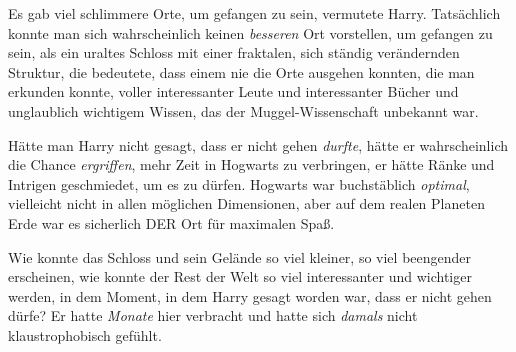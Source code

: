 Es gab viel schlimmere Orte, um gefangen zu sein, vermutete Harry. Tatsächlich konnte man sich wahrscheinlich keinen \emph{besseren} Ort vorstellen, um gefangen zu sein, als ein uraltes Schloss mit einer fraktalen, sich ständig verändernden Struktur, die bedeutete, dass einem nie die Orte ausgehen konnten, die man erkunden konnte, voller interessanter Leute und interessanter Bücher und unglaublich wichtigem Wissen, das der Muggel-Wissenschaft unbekannt war.

Hätte man Harry nicht gesagt, dass er nicht gehen \emph{durfte}, hätte er wahrscheinlich die Chance \emph{ergriffen}, mehr Zeit in Hogwarts zu verbringen, er hätte Ränke und Intrigen geschmiedet, um es zu dürfen. Hogwarts war buchstäblich \emph{optimal}, vielleicht nicht in allen möglichen Dimensionen, aber auf dem realen Planeten Erde war es sicherlich DER Ort für maximalen Spaß.

Wie konnte das Schloss und sein Gelände so viel kleiner, so viel beengender erscheinen, wie konnte der Rest der Welt so viel interessanter und wichtiger werden, in dem Moment, in dem Harry gesagt worden war, dass er nicht gehen dürfe? Er hatte \emph{Monate} hier verbracht und hatte sich \emph{damals} nicht klaustrophobisch gefühlt.

